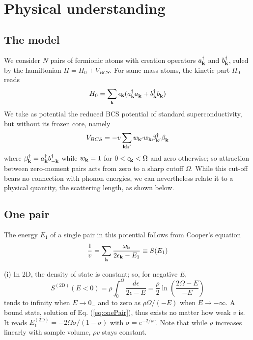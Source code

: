 \documentclass[5p,twocolumn]{elsarticle}
\begin{document}
\section{Physical understanding}
\subsection{The model\label{sec:model}}
We consider $N$ pairs of fermionic atoms with creation operators $a_{\mathbf{k}}^\dagger$ and $b_{\mathbf{k}}^\dagger$, ruled by the hamiltonian
$H=H_{0}+V_{BCS}$. For same mass atoms, the kinetic part $H_0$ reads 
\begin{equation}
H_0=\sum_{\mathbf{k}}\epsilon_{\mathbf{k}}(a^\dagger_{\mathbf{k}}{}a^{}_{\mathbf{k}}+b^\dagger_{\mathbf{k}}{}b^{}_{\mathbf{k}})
\end{equation}
We take as potential  the reduced BCS potential of standard superconductivity, but without its frozen core, namely
\begin{equation}
V_{BCS}=-v\sum_{\mathbf{k}\mathbf{k}'}w_{\mathbf{k}'}w_{\mathbf{k}}\beta^\dagger_{\mathbf{k}'}{}\beta^{}_{\mathbf{k}}
\label{eq:VBcs}
\end{equation}
 where $\beta^\dagger_{\mathbf{k}}=a^\dagger_{\mathbf{k}}b^\dagger_{-\mathbf{k}}$ while $w_{\mathbf{k}}=1$ for $0<\epsilon_{\mathbf{k}}<\Omega$ and zero otherwise; so attraction between zero-moment pairs acts from zero to a sharp cutoff $\Omega$. While this cut-off  bears no connection with phonon energies, we can nevertheless relate it to a physical quantity,  the scattering length, as shown below.
 \subsection{One pair\label{sec:onePair}}
The energy $E_1$ of a single pair in this potential follows from Cooper's equation
\begin{equation}
\frac{1}{v}=\sum_{\mathbf{k}}\frac{\omega_{\mathbf{k}}}{2\epsilon_{\mathbf{k}}-E_1}\equiv{}S(E_1)
\label{eq:onePair}
\end{equation}

(i) In 2D, the density of state is constant; so, for negative $E$, 
\begin{equation}
S^{(\text{2D})}(E<0)=\rho\int_0^{\Omega}\frac{d\epsilon}{2\epsilon-E}=\frac{\rho}{2}\ln\left(\frac{2\Omega-E}{-E}\right)
\label{eq:s1pair}
\end{equation}
tends to infinity when $E\rightarrow{}0_{-}$ and to zero as $\rho\Omega/(-E)$ when $E\rightarrow-\infty$. A bound state, solution of Eq. (\ref{eq:onePair}), thus exists no matter how weak $v$ is. It reads
$
E_1^{(\text{2D})}=-2\Omega\sigma/(1-\sigma)
$
with $\sigma=e^{-2/\rho{v}}$. Note that while $\rho$ increases linearly with sample volume, $\rho{v}$ stays constant.
\end{document}
